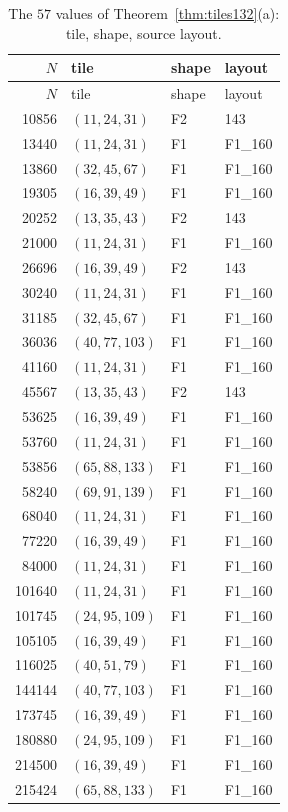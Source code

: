 \documentclass[11pt,reqno]{amsart}
\theoremstyle{plain}
\theoremstyle{definition}
\begin{document}
\begin{longtable}{rlll}
\caption{The $57$ values of Theorem~\ref{thm:tiles132}(a): tile, shape, source layout.}\label{tab:lift57}\\
\hline $N$ & tile & shape & layout\\ \hline\endfirsthead
\hline $N$ & tile & shape & layout\\ \hline\endhead
10856 & $(11,24,31)$ & F2 & 143 \\
13440 & $(11,24,31)$ & F1 & F1\_160 \\
13860 & $(32,45,67)$ & F1 & F1\_160 \\
19305 & $(16,39,49)$ & F1 & F1\_160 \\
20252 & $(13,35,43)$ & F2 & 143 \\
21000 & $(11,24,31)$ & F1 & F1\_160 \\
26696 & $(16,39,49)$ & F2 & 143 \\
30240 & $(11,24,31)$ & F1 & F1\_160 \\
31185 & $(32,45,67)$ & F1 & F1\_160 \\
36036 & $(40,77,103)$ & F1 & F1\_160 \\
41160 & $(11,24,31)$ & F1 & F1\_160 \\
45567 & $(13,35,43)$ & F2 & 143 \\
53625 & $(16,39,49)$ & F1 & F1\_160 \\
53760 & $(11,24,31)$ & F1 & F1\_160 \\
53856 & $(65,88,133)$ & F1 & F1\_160 \\
58240 & $(69,91,139)$ & F1 & F1\_160 \\
68040 & $(11,24,31)$ & F1 & F1\_160 \\
77220 & $(16,39,49)$ & F1 & F1\_160 \\
84000 & $(11,24,31)$ & F1 & F1\_160 \\
101640 & $(11,24,31)$ & F1 & F1\_160 \\
101745 & $(24,95,109)$ & F1 & F1\_160 \\
105105 & $(16,39,49)$ & F1 & F1\_160 \\
116025 & $(40,51,79)$ & F1 & F1\_160 \\
144144 & $(40,77,103)$ & F1 & F1\_160 \\
173745 & $(16,39,49)$ & F1 & F1\_160 \\
180880 & $(24,95,109)$ & F1 & F1\_160 \\
214500 & $(16,39,49)$ & F1 & F1\_160 \\
215424 & $(65,88,133)$ & F1 & F1\_160 \\

\end{longtable}
\end{document}
